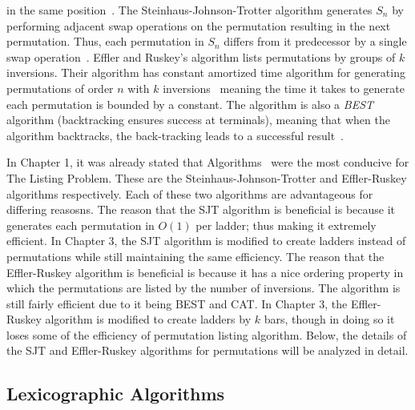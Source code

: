 in the same position~\cite{A35}. The Steinhaus-Johnson-Trotter algorithm generates $S_{n}$ by performing adjacent swap operations 
on the permutation resulting in the next permutation. Thus, each permutation in $S_{n}$ differs 
from it predecessor by a single swap operation~\cite{A25}.
Effler and Ruskey's algorithm lists permutations by groups of $k$ inversions. Their algorithm has 
constant amortized time algorithm for generating permutations of order $n$ with $k$ inversions~\cite{A26} meaning 
the time it takes to generate each permutation is bounded by a constant.
The algorithm is also a \emph{BEST} algorithm (backtracking ensures success at terminals), meaning that when the algorithm backtracks, 
the back-tracking leads to a successful result~\cite{A26}.\par 
In Chapter 1, it was already stated that Algorithms~\cite{A25}\cite{A26} were the most conducive for The Listing Problem. 
These are the Steinhaus-Johnson-Trotter and Effler-Ruskey algorithms respectively. Each of these two algorithms are 
advantageous for differing reasosns. The reason that the SJT algorithm is beneficial is because it generates each 
permutation in $O(1)$ per ladder; thus making it extremely efficient. In Chapter 3, the SJT 
algorithm is modified to create ladders instead of permutations while still maintaining the same efficiency.
The reason that the Effler-Ruskey algorithm 
is beneficial is because it has a nice ordering property in which the permutations are listed by the number of inversions.
The algorithm is still fairly efficient due to it being BEST and CAT. In Chapter 3, the Effler-Ruskey algorithm 
is modified to create ladders by $k$ bars, though in doing so it loses some of the efficiency of permutation listing algorithm.
Below, the details of the SJT and Effler-Ruskey algorithms for permutations will be analyzed in detail.

\subsection{Lexicographic Algorithms}

